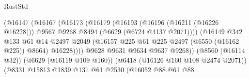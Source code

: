 \begin{lexlean}{RustStd}
\begin{coremodule}
                                                (@16147
                                                  (@16167
                                                    (@16173
                                                      (@16179
                                                        (@16193
                                                          (@16196 (@16211 (@16226 @16228)))
                                                          @9567
                                                          @9268
                                                          @8494
                                                          (@6629 (@6724 @4137 @2071))))
                                                      (@16149
                                                        @342
                                                        @133
                                                        @61
                                                        @14
                                                        @2497
                                                        @2049
                                                        (@16157
                                                          @225
                                                          @61
                                                          @225
                                                          @2497
                                                          (@6550 (@16162 @225))
                                                          @8664)
                                                        @16228))))
                                                @9628
                                                @9631
                                                @9634
                                                @9637
                                                @9268))
                                            (@8560 (@16114 @32))
                                            (@6629 (@16119 @109 @160))
                                            (@6418 (@16126 @160 @108 @2474 @2071))
                                            (@8331
                                              @15813
                                              @1839
                                              @131
                                              @61
                                              @2530
                                              (@16052
                                                @88
                                                @61
                                                @88

\end{coremodule}
\end{lexlean}
